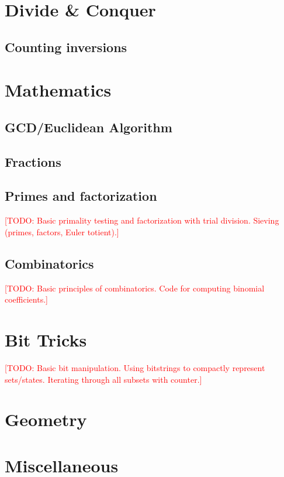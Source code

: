 \documentclass[10pt]{book}
\newcommand{\todo}[1]{\textcolor{red}{[TODO: #1]}}
\begin{document}
\chapter{Divide \& Conquer}

\section{Counting inversions}

\chapter{Mathematics}

\section{GCD/Euclidean Algorithm}

\section{Fractions}

\section{Primes and factorization}

\todo{Basic primality testing and factorization with trial division.
  Sieving (primes, factors, Euler totient).}

\section{Combinatorics}

\todo{Basic principles of combinatorics.  Code for computing binomial
  coefficients.}

\chapter{Bit Tricks}

\todo{Basic bit manipulation.  Using bitstrings to compactly represent
  sets/states.  Iterating through all subsets with counter.}

\chapter{Geometry}

\chapter{Miscellaneous}
\end{document}
